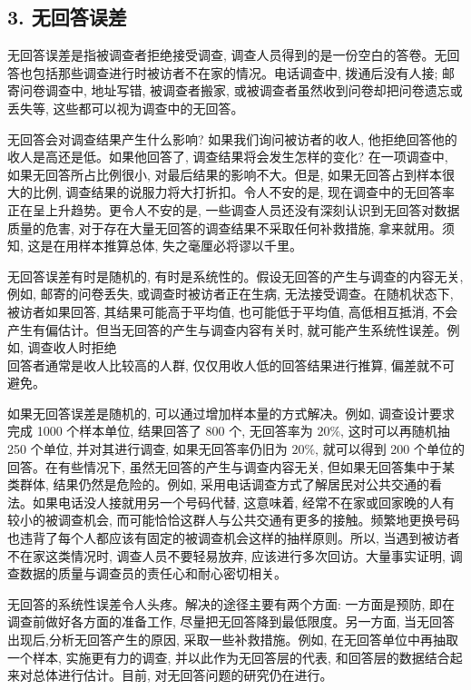 \documentclass[10pt]{article}
\begin{document}
\begin{CJK*}{UTF8}{bsmi}
\section*{3. 无回答误差}
无回答误差是指被调查者拒绝接受调查, 调查人员得到的是一份空白的答卷。无回答也包括那些调查进行时被访者不在家的情况。电话调查中, 拨通后没有人接; 邮寄问卷调查中, 地址写错, 被调查者搬家, 或被调查者虽然收到问卷却把问卷遗忘或丢失等, 这些都可以视为调查中的无回答。

无回答会对调查结果产生什么影响? 如果我们询问被访者的收人, 他拒绝回答他的收人是高还是低。如果他回答了, 调查结果将会发生怎样的变化? 在一项调查中, 如果无回答所占比例很小, 对最后结果的影响不大。但是, 如果无回答占到样本很大的比例, 调查结果的说服力将大打折扣。令人不安的是, 现在调查中的无回答率正在呈上升趋势。更令人不安的是, 一些调查人员还没有深刻认识到无回答对数据质量的危害, 对于存在大量无回答的调查结果不采取任何补救措施, 拿来就用。须知, 这是在用样本推算总体, 失之毫厘必将谬以千里。

无回答误差有时是随机的, 有时是系统性的。假设无回答的产生与调查的内容无关,例如, 邮寄的问卷丢失, 或调查时被访者正在生病, 无法接受调查。在随机状态下, 被访者如果回答, 其结果可能高于平均值, 也可能低于平均值, 高低相互抵消, 不会产生有偏估计。但当无回答的产生与调查内容有关时, 就可能产生系统性误差。例如, 调查收人时拒绝\\
回答者通常是收人比较高的人群, 仅仅用收人低的回答结果进行推算, 偏差就不可避免。

如果无回答误差是随机的, 可以通过增加样本量的方式解决。例如, 调查设计要求完成 1000 个样本单位, 结果回答了 800 个, 无回答率为 $20 \%$, 这时可以再随机抽 250 个单位, 并对其进行调查, 如果无回答率仍旧为 $20 \%$, 就可以得到 200 个单位的回答。在有些情况下, 虽然无回答的产生与调查内容无关, 但如果无回答集中于某类群体, 结果仍然是危险的。例如, 采用电话调查方式了解居民对公共交通的看法。如果电话没人接就用另一个号码代替, 这意味着, 经常不在家或回家晚的人有较小的被调查机会, 而可能恰恰这群人与公共交通有更多的接触。频繁地更换号码也违背了每个人都应该有固定的被调查机会这样的抽样原则。所以, 当遇到被访者不在家这类情况时, 调查人员不要轻易放弃, 应该进行多次回访。大量事实证明, 调查数据的质量与调查员的责任心和耐心密切相关。

无回答的系统性误差令人头疼。解决的途径主要有两个方面: 一方面是预防, 即在调查前做好各方面的准备工作, 尽量把无回答降到最低限度。另一方面, 当无回答出现后,分析无回答产生的原因, 采取一些补救措施。例如, 在无回答单位中再抽取一个样本, 实施更有力的调查, 并以此作为无回答层的代表, 和回答层的数据结合起来对总体进行估计。目前, 对无回答问题的研究仍在进行。


\end{CJK*}
\end{document}
